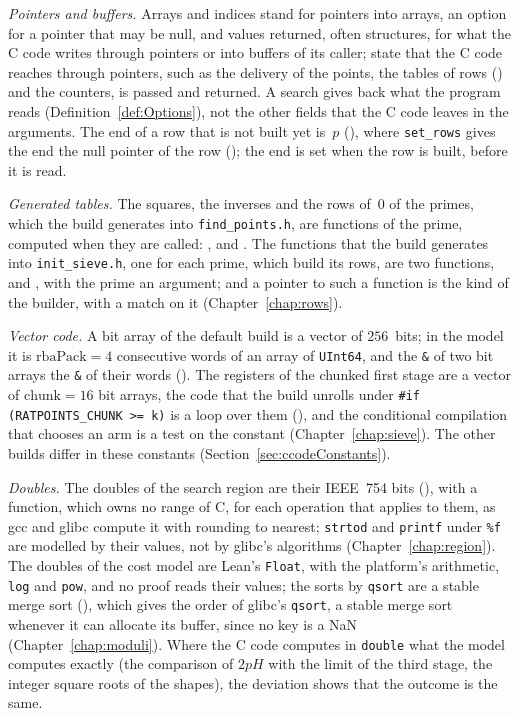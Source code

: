 \emph{Pointers and buffers.} Arrays and indices stand for pointers into arrays, an option for a
pointer that may be null, and values returned, often structures, for what the C code writes
through pointers or into buffers of its caller; state that the C code reaches through pointers,
such as the delivery of the points, the tables of rows () and the
counters, is passed and returned. A search gives back what the program reads
(Definition~\ref{def:Options}), not the other fields that the C code leaves in the arguments. The
end of a row that is not built yet is~$p$ (), where \verb|set_rows|
gives the end the null pointer of the row (); the end is set when
the row is built, before it is read.

\emph{Generated tables.} The squares, the inverses and the rows of~$0$ of the primes, which the
build generates into \verb|find_points.h|, are functions of the prime, computed when they are
called: ,  and
. The functions that the build generates into \verb|init_sieve.h|,
one for each prime, which build its rows, are two functions,  and
, with the prime an argument; and a pointer to such a function is
the kind of the builder, with a match on it (Chapter~\ref{chap:rows}).

\emph{Vector code.} A bit array of the default build is a vector of $256$~bits; in the model it is
$\mathrm{rbaPack} = 4$ consecutive words of an array of \verb|UInt64|, and the \verb|&| of two bit
arrays the \verb|&| of their words (). The registers of the
chunked first stage are a vector of $\mathrm{chunk} = 16$ bit arrays, the code that the build
unrolls under \verb|#if (RATPOINTS_CHUNK >= k)| is a loop over them
(), and the conditional compilation that chooses an arm is a test
on the constant (Chapter~\ref{chap:sieve}). The other builds differ in these constants
(Section~\ref{sec:ccodeConstants}).

\emph{Doubles.} The doubles of the search region are their IEEE~754 bits (),
with a function, which owns no range of C, for each operation that \ratpoints{} applies to them, as gcc
and glibc compute it with rounding to nearest; \verb|strtod| and \verb|printf| under \verb|%f| are
modelled by their values, not by glibc's algorithms (Chapter~\ref{chap:region}). The doubles of the
cost model are Lean's \verb|Float|, with the platform's arithmetic, \verb|log| and \verb|pow|, and
no proof reads their values; the sorts by \verb|qsort| are a stable merge sort
(), which gives the order of glibc's \verb|qsort|, a stable merge sort
whenever it can allocate its buffer, since no key is a NaN (Chapter~\ref{chap:moduli}). Where the C
code computes in \verb|double| what the model computes exactly (the comparison of $2pH$ with the
limit of the third stage, the integer square roots of the shapes), the deviation shows that the
outcome is the same.

